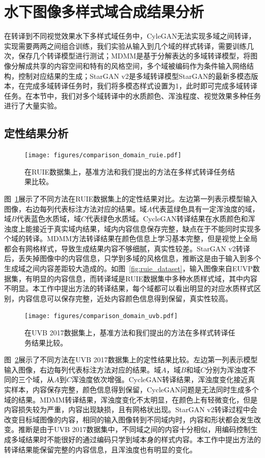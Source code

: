 \section{水下图像多样式域合成结果分析}
在转译到不同视觉效果水下多样式域任务中，CyleGAN无法实现多域之间转译，实现需要两两之间组合训练，我们实验从输入到几个域的样式转译，需要训练几次，保存几个转译模型进行测试；MDMM是基于分解表达的多域转译模型，将图像分解成共享的内容空间和特有的风格空间，多个域被编码作为条件输入网络结构，控制对应结果的生成；StarGAN v2是多域转译模型StarGAN的最新多模态版本，在完成多域转译任务时，我们将多模态样式设置为1，此时即可完成多域转译任务。在本节中，我们对多个域转译中的水质颜色、浑浊程度、视觉效果多种任务进行了大量实验。

\subsection{定性结果分析}
\begin{figure}[htp]
    \centering
  \texttt{[image: figures/comparison\_domain\_ruie.pdf]}
  \caption{在RUIE数据集上，基准方法和我们提出的方法在多样式转译任务结果比较。}
  \label{fig:comparison_domain_ruie}
\end{figure}

图~\ref{fig:comparison_domain_ruie}展示了不同方法在RUIE数据集上的定性结果对比。左边第一列表示模型输入图像，右边每列代表标注方法对应的结果。域$A$代表蓝绿色具有一定浑浊度的域，域$B$代表蓝色水质域，域$C$代表绿色水质域。CycleGAN转译结果在水质颜色和浑浊度上能接近于真实域内结果，域内内容信息保存完整，缺点在于不能同时实现多个域的转译。MDMM方法转译结果在颜色信息上学习基本完整，但是视觉上全局都会有网格样式，导致生成结果内容不够细腻，真实性较差。StarGAN v2转译后，丢失掉图像中的内容信息，只学到多域的风格信息，推断这是由于输入到多个生成域之间内容差距较大造成的。如图~\ref{fig:ruie_dataset}，输入图像来自EUVP数据集，有明显的内容信息，而转译域是RUIE数据集中多种水质样式域，其中内容不明显。本工作中提出方法的转译结果，每个域都可以看出明显的对应水质样式区别，内容信息可以保存完整，近处内容颜色信息得到保留，真实性较高。

\begin{figure}[htp]
    \centering
  \texttt{[image: figures/comparison\_domain\_uvb.pdf]}
  \caption{在UVB 2017数据集上，基准方法和我们提出的方法在多样式转译任务结果比较。}
  \label{fig:comparison_domain_uvb}
\end{figure}

图~\ref{fig:comparison_domain_uvb}展示了不同方法在UVB 2017数据集上的定性结果比较。左边第一列表示模型输入图像，右边每列代表标注方法对应的结果。域$A$，域$B$和域$C$分别为浑浊度不同的三个域，从$A$到$C$浑浊度依次增强。CycleGAN转译结果，浑浊度变化接近真实样本，内容保存完整，颜色信息得到保留，CycleGAN问题是无法同时生成多个域的结果。MDMM转译结果，浑浊度变化不太明显，在颜色上有轻微变化，但是内容损失较为严重，内容出现缺损，且有网格状出现。StarGAN v2转译过程中会改变目标域图像的内容，相同的输入图像转到不同域内时，内容和形状都会发生改变。推断是由于UVB 2017数据集中，不同域之间的内容十分相似，用编码控制生成多域结果时不能很好的通过编码只学到域本身的样式内容。本工作中提出方法的转译结果能保留完整的内容信息，且浑浊度也有明显的变化。

